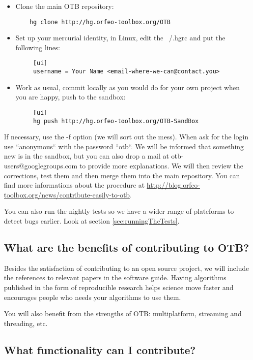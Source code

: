 \begin{itemize}
  \item Clone the main OTB repository:
    \begin{verbatim}
    hg clone http://hg.orfeo-toolbox.org/OTB
    \end{verbatim}
  \item Set up your mercurial identity, in Linux, edit the ~/.hgrc and put the following lines:
    \begin{verbatim}
     [ui]
     username = Your Name <email-where-we-can@contact.you>
    \end{verbatim}
  \item Work as usual, commit locally as you would do for your own project
    when you are happy, push to the sandbox:
    \begin{verbatim}
     [ui]
     hg push http://hg.orfeo-toolbox.org/OTB-SandBox
    \end{verbatim}
\end{itemize}

If necessary, use the -f option (we will sort out the mess). When ask
for the login use ``anonymous`` with the password ``otb``.  We will be
informed that something new is in the sandbox, but you can also drop a
mail at otb-users@googlegroups.com to provide more explanations.
We will then review the corrections, test them and then merge them
into the main repository.  You can find more informations about the
procedure at
\url{http://blog.orfeo-toolbox.org/news/contribute-easily-to-otb}.

You can also run the nightly tests so we have a wider range of plateforms to detect
bugs earlier. Look at section \ref{sec:runningTheTests}.

\subsection{What are the benefits of contributing to OTB?}

Besides the satisfaction of contributing to an open source project, we will include
the references to relevant papers in the software guide. Having algorithms
published in the form of reproducible research helps science move faster and
encourages people who needs your algorithms to use them.

You will also benefit from the strengths of OTB: multiplatform, streaming and
threading, etc.

\subsection{What functionality can I contribute?}

